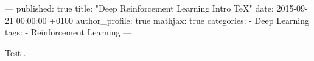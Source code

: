---
published: true
title: "Deep Reinforcement Learning Intro TeX"
date:   2015-09-21 00:00:00 +0100
author_profile: true
mathjax: true
categories:
  - Deep Learning
tags:
  - Reinforcement Learning
---

Test \latex.

